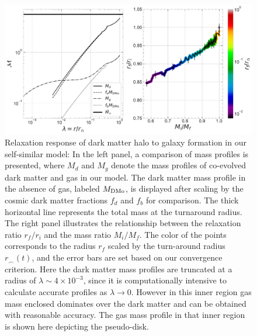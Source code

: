 \begin{figure}[htbp]
\centering
\includegraphics[width=0.99\linewidth,trim={0 0cm 0cm 0},clip]{plots/relx_reln_ref.pdf}
\caption{Relaxation response of dark matter halo to galaxy formation in our self-similar model: In the left panel, a comparison of mass profiles is presented, where $M_d$ and $M_g$ denote the mass profiles of co-evolved dark matter and gas in our model. The dark matter mass profile in the absence of gas, labeled $M_{\rm DMo}$, is displayed after scaling by the cosmic dark matter fractions $f_d$ and $f_b$ for comparison. The thick horizontal line represents the total mass at the turnaround radius. The right panel illustrates the relationship between the relaxation ratio $r_f/r_i$ and the mass ratio $M_i/M_f$. The color of the points corresponds to the radius $r_f$ scaled by the turn-around radius $r_{\smallfrown}(t)$,  and the error bars are set based on our convergence criterion. Here the dark matter mass profiles are truncated at a radius of $\lambda\sim 4 \times 10^{-3}$, since it is computationally intensive to calculate accurate profiles as $\lambda \rightarrow 0$. However in this inner region gas mass enclosed dominates over the dark matter and can be obtained with reasonable accuracy. The gas mass profile in that inner region is shown here depicting the pseudo-disk.}%
\label{fig:relx_reln-ch:ssr}
\end{figure}

